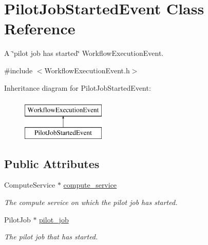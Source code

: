 \hypertarget{class_pilot_job_started_event}{}\section{Pilot\+Job\+Started\+Event Class Reference}
\label{class_pilot_job_started_event}


A \char`\"{}pilot job has started\char`\"{} Workflow\+Execution\+Event.  




{\ttfamily \#include $<$Workflow\+Execution\+Event.\+h$>$}

Inheritance diagram for Pilot\+Job\+Started\+Event\+:\begin{figure}[H]
\begin{center}
\leavevmode
\includegraphics[height=2.000000cm]{class_pilot_job_started_event}
\end{center}
\end{figure}
\subsection*{Public Attributes}
\begin{DoxyCompactItemize}
\item 
\mbox{\label{class_pilot_job_started_event_a8402a72e10bff606752aae559139072c}} 
Compute\+Service $\ast$ \hyperlink{class_pilot_job_started_event_a8402a72e10bff606752aae559139072c}{compute\+\_\+service}
\begin{DoxyCompactList}\small\item\em The compute service on which the pilot job has started. \end{DoxyCompactList}\item 
\mbox{\label{class_pilot_job_started_event_a5e4cdb7f3b5c5676771d2039fb34f2c3}} 
Pilot\+Job $\ast$ \hyperlink{class_pilot_job_started_event_a5e4cdb7f3b5c5676771d2039fb34f2c3}{pilot\+\_\+job}
\begin{DoxyCompactList}\small\item\em The pilot job that has started. \end{DoxyCompactList}\end{DoxyCompactItemize}


